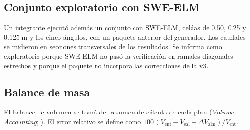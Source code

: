 \subsection{Conjunto exploratorio con SWE-ELM}
Un integrante ejecutó además un conjunto con SWE-ELM, celdas de 0.50, 0.25 y 0.125 m y los cinco ángulos, con un paquete anterior del generador. Los caudales se midieron en secciones transversales de los resultados. Se informa como exploratorio porque SWE-ELM no pasó la verificación en ramales diagonales estrechos y porque el paquete no incorpora las correcciones de la v3.

\subsection{Balance de masa}
El balance de volumen se tomó del resumen de cálculo de cada plan (\textit{Volume Accounting}; \citealt{hecmass}). El error relativo se define como $100\,(V_\mathrm{ent}-V_\mathrm{sal}-\Delta V_\mathrm{alm})/V_\mathrm{ent}$.
